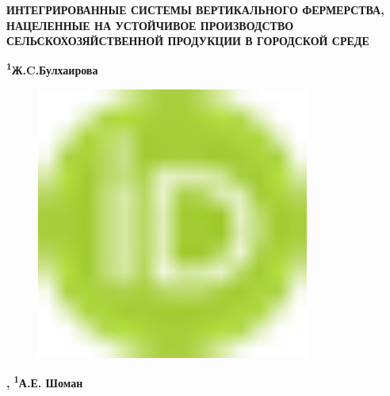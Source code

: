 
{\bfseries ИНТЕГРИРОВАННЫЕ СИСТЕМЫ ВЕРТИКАЛЬНОГО ФЕРМЕРСТВА, НАЦЕЛЕННЫЕ НА
УСТОЙЧИВОЕ ПРОИЗВОДСТВО СЕЛЬСКОХОЗЯЙСТВЕННОЙ ПРОДУКЦИИ В ГОРОДСКОЙ
СРЕДЕ}

{\bfseries \textsuperscript{1}Ж.C.Булхаирова}
\begin{figure}[H]
	\centering
	\includegraphics[width=0.8\textwidth]{media/ekon2/image1}
	\caption*{}
\end{figure}
{\bfseries \textsuperscript{\envelope },}
{\bfseries \textsuperscript{1}А.Е. Шоман}


